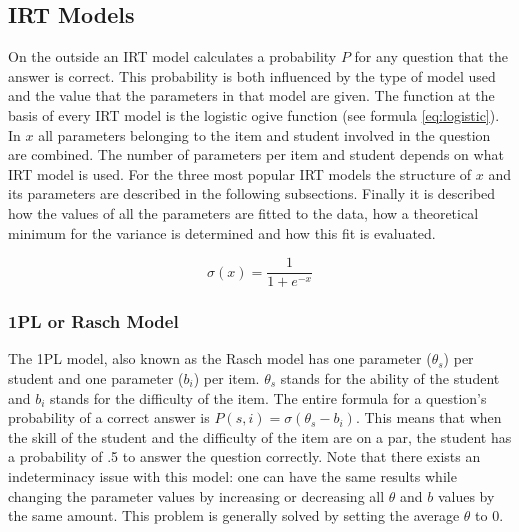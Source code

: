 \documentclass{scrartcl}
\begin{document}
\subsection{IRT Models}
On the outside an IRT model calculates a probability $P$ for any question that the answer is correct. This probability is both influenced by the type of model used and the value that the parameters in that model are given. The function at the basis of every IRT model is the logistic ogive function (see formula \ref{eq:logistic}). In $x$ all parameters belonging to the item and student involved in the question are combined. The number of parameters per item and student depends on what IRT model is used. For the three most popular IRT models the structure of $x$ and its parameters are described in the following subsections. Finally it is described how the values of all the parameters are fitted to the data, how a theoretical minimum for the variance is determined and how this fit is evaluated. 

\begin{equation}
\label{eq:logistic}
\sigma(x) = \frac{1}{1+e^{-x}}
\end{equation}

\subsubsection{1PL or Rasch Model}
\label{sec:1PL}
The 1PL model, also known as the Rasch model has one parameter ($\theta_{s}$) per student and one parameter ($b_{i}$) per item. $\theta_{s}$ stands for the ability of the student and $b_{i}$ stands for the difficulty of the item. The entire formula for a question's probability of a correct answer is $P(s,i) = \sigma(\theta_{s} - b_{i})$. This means that when the skill of the student and the difficulty of the item are on a par, the student has a probability of .5 to answer the question correctly. Note that there exists an indeterminacy issue with this model: one can have the same results while changing the parameter values by increasing or decreasing all $\theta$ and $b$ values by the same amount. This problem is generally solved by setting the average $\theta$ to 0.
\end{document}
